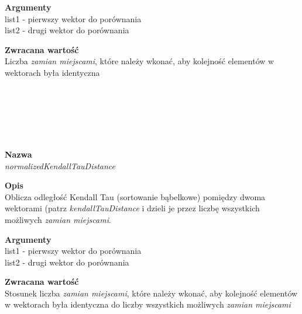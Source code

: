 \begin{spacing}{1.1}
\begin{spacing}{1.1}
\begin{spacing}{1.1}
\begin{spacing}{1.2}
\begin{spacing}{1.1}
\begin{spacing}{1.2}
\begin{spacing}{1.2}
\textbf{Argumenty} \\
list1 - pierwszy wektor do porównania\\  
list2 - drugi wektor do porównania \\ \begin{spacing}{0.3}  \end{spacing}

\textbf{Zwracana wartość}\\ Liczba \textit{zamian miejscami}, które należy wkonać, aby kolejność elementów w wektorach była identyczna \\ \begin{spacing}{0.3}  \end{spacing}\\


\\~\\ 
\begin{spacing}{1.2}
 \\ \begin{spacing}{0.5}  \end{spacing}

\textbf{Nazwa}\\  \emph{normalizedKendallTauDistance} \\ \begin{spacing}{0.3}  \end{spacing}
 
\textbf{Opis}\\ Oblicza odległość Kendall Tau (sortowanie bąbelkowe) pomiędzy dwoma wektorami (patrz \textit{kendallTauDistance} i dzieli je przez liczbę wszystkich możliwych \textit{zamian miejscami}. \\  \begin{spacing}{0.3}  \end{spacing}
 
\textbf{Argumenty} \\
list1 - pierwszy wektor do porównania\\  
list2 - drugi wektor do porównania \\ \begin{spacing}{0.3}  \end{spacing}

\textbf{Zwracana wartość}\\ Stosunek liczba \textit{zamian miejscami}, które należy wkonać, aby kolejność elementów w wektorach była identyczna do liczby wszystkich możliwych \textit{zamian miejscami} \\ \begin{spacing}{0.3}  \end{spacing}\\





\end{spacing}
\end{spacing}
\end{spacing}
\end{spacing}
\end{spacing}
\end{spacing}
\end{spacing}
\end{spacing}
